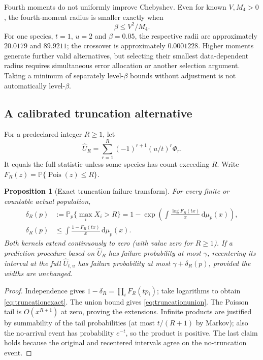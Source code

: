 \documentclass[11pt]{article}
\numberwithin{equation}{section}
\newtheorem{proposition}[proposition]{Proposition}
\theoremstyle{definition}
\theoremstyle{remark}
\newcommand{\Pp}{\mathbb P}
\newcommand{\Pois}{\operatorname{Pois}}
\newcommand{\dd}{\,\mathrm d}
\begin{document}
Fourth moments do not uniformly improve Chebyshev. Even for known $V,M_4>0$, the fourth-moment radius is smaller exactly when
\begin{equation}\label{eq:fourthcomparison}
 \beta\le V^2/M_4.
\end{equation}
For one species, $t=1$, $u=2$ and $\beta=0.05$, the respective radii are approximately $20.0179$ and $89.9211$; the crossover is approximately $0.0001228$. Higher moments generate further valid alternatives, but selecting their smallest data-dependent radius requires simultaneous error allocation or another selection argument. Taking a minimum of separately level-$\beta$ bounds without adjustment is not automatically level-$\beta$.

\subsection{A calibrated truncation alternative}\label{subsec:truncation}
For a predeclared integer $R\ge1$, let
\[
 \widehat U_R=\sum_{r=1}^R(-1)^{r+1}(u/t)^r\Phi_r.
\]
It equals the full statistic unless some species has count exceeding $R$. Write $F_R(z)=\Pp\{\Pois(z)\le R\}$.
\begin{proposition}[Exact truncation failure transform]\label{prop:truncation}
For every finite or countable actual population,
\begin{align}
 \delta_R(p)&:=\Pp_p\{\max_iX_i>R\}
 =1-\exp\left(\int\frac{\log F_R(tx)}x\dd\mu_p(x)\right),\label{eq:truncationexact}\\
 \delta_R(p)&\le
 \int\frac{1-F_R(tx)}x\dd\mu_p(x).\label{eq:truncationunion}
\end{align}
Both kernels extend continuously to zero (with value zero for $R\ge1$). If a prediction procedure based on $\widehat U_R$ has failure probability at most $\gamma$, recentering its interval at the full $\widehat U_{t,u}$ has failure probability at most $\gamma+\delta_R(p)$, provided the widths are unchanged.
\end{proposition}
\begin{proof}
Independence gives $1-\delta_R=\prod_iF_R(tp_i)$; take logarithms to obtain \eqref{eq:truncationexact}. The union bound gives \eqref{eq:truncationunion}. The Poisson tail is $O(x^{R+1})$ at zero, proving the extensions. Infinite products are justified by summability of the tail probabilities (at most $t/(R+1)$ by Markov); also the no-arrival event has probability $e^{-t}$, so the product is positive. The last claim holds because the original and recentered intervals agree on the no-truncation event.
\end{proof}
\end{document}
